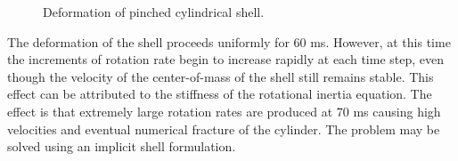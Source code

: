 \begin{figure}[htpb!]
\begin{center}
      \end{center}
      \caption{Deformation of pinched cylindrical shell.}
      \label{fig:cylShell}
    \end{figure}
    The deformation of the shell proceeds uniformly for 60 ms.  However,
    at this time the increments of rotation rate begin to increase rapidly at
    each time step, even though the velocity of the center-of-mass of the
    shell still remains stable.  This effect can be attributed to the stiffness
    of the rotational inertia equation.  The effect is that extremely
    large rotation rates are produced at 70 ms causing high velocities
    and eventual numerical fracture of the cylinder.  The problem may be
    solved using an implicit shell formulation.

